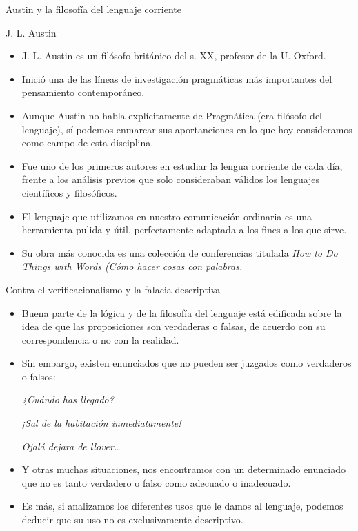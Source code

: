 \documentclass{beamer}
\begin{document}
\begin{frame}{}
\begin{center}
  \LARGE{Austin y la filosofía del lenguaje corriente}
\end{center} 
\end{frame}

\begin{frame}{J. L. Austin}

\begin{itemize}
	\item J. L. Austin es un filósofo británico del s. XX, profesor de la U. Oxford. 
	\item Inició una de las líneas de investigación pragmáticas más importantes del pensamiento contemporáneo.
	\item Aunque Austin no habla explícitamente de Pragmática (era filósofo del lenguaje), sí podemos enmarcar sus aportanciones en lo que hoy consideramos como campo de esta disciplina.
	\item Fue uno de los primeros autores en estudiar la lengua corriente de cada día, frente a los análisis previos que solo consideraban válidos los lenguajes científicos y filosóficos.
	\item El lenguaje que utilizamos en nuestro comunicación ordinaria es una herramienta pulida y útil, perfectamente adaptada a los fines a los que sirve. 
	\item Su obra más conocida es una colección de conferencias titulada \it{How to Do Things with Words} (Cómo hacer cosas con palabras.
\end{itemize}

\end{frame}

\begin{frame}{Contra el verificacionalismo y la falacia descriptiva}

\begin{itemize}
	\item Buena parte de la lógica y de la filosofía del lenguaje está edificada sobre la idea de que las proposiciones son verdaderas o falsas, de acuerdo con su correspondencia o no con la realidad.
	\item Sin embargo, existen enunciados que no pueden ser juzgados como verdaderos o falsos:
	
	\it{¿Cuándo has llegado?}

	\it{¡Sal de la habitación inmediatamente!}

	\it{Ojalá dejara de llover\ldots}
	
	\item Y otras muchas situaciones, nos encontramos con un determinado enunciado que no es tanto verdadero o falso como adecuado o inadecuado.  
	\item Es más, si analizamos los diferentes usos que le damos al lenguaje, podemos deducir que su uso no es exclusivamente descriptivo. 
\end{itemize}

\end{frame}
\end{document}
